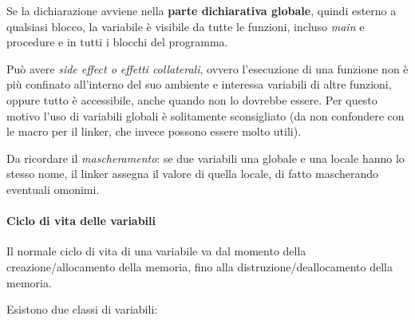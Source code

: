 \documentclass[
  paper=a4,
  oneside  ,captions=tableheading
]{scrbook}
\begin{document}
Se la dichiarazione avviene nella \textbf{parte dichiarativa globale},
quindi esterno a qualsiasi blocco, la variabile è visibile da tutte le
funzioni, incluso \emph{main} e procedure e in tutti i blocchi del
programma.

Può avere \emph{side effect o effetti collaterali}, ovvero l'esecuzione
di una funzione non è più confinato all'interno del suo ambiente e
interessa variabili di altre funzioni, oppure tutto è accessibile, anche
quando non lo dovrebbe essere. Per questo motivo l'uso di variabili
globali è solitamente sconsigliato (da non confondere con le macro per
il linker, che invece possono essere molto utili).

Da ricordare il \emph{mascheramento}: se due variabili una globale e una
locale hanno lo stesso nome, il linker assegna il valore di quella
locale, di fatto mascherando eventuali omonimi.

\hypertarget{ciclo-di-vita-delle-variabili}{%
\paragraph{Ciclo di vita delle
variabili}\label{ciclo-di-vita-delle-variabili}}

Il normale ciclo di vita di una variabile va dal momento della
creazione/allocamento della memoria, fino alla distruzione/deallocamento
della memoria.

Esistono due classi di variabili:
\end{document}
